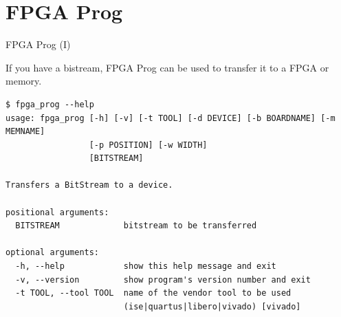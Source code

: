 \documentclass{beamer}
\newcommand{\fpgasetup}      {\textit{fpga\_setup}}
\newcommand{\console}        {\textit{console}}
\newcommand{\makefile}       {\textit{Makefile}}
\begin{document}
%  
%  

%  



\section{FPGA Prog}

\begin{frame}[fragile]{FPGA Prog (I)}
  \begin{block}{}
    If you have a bistream, FPGA Prog can be used to transfer it to a FPGA or memory.
  \end{block}{}
  \scriptsize
  \begin{verbatim}
$ fpga_prog --help
usage: fpga_prog [-h] [-v] [-t TOOL] [-d DEVICE] [-b BOARDNAME] [-m MEMNAME]
                 [-p POSITION] [-w WIDTH]
                 [BITSTREAM]

Transfers a BitStream to a device.

positional arguments:
  BITSTREAM             bitstream to be transferred

optional arguments:
  -h, --help            show this help message and exit
  -v, --version         show program's version number and exit
  -t TOOL, --tool TOOL  name of the vendor tool to be used
                        (ise|quartus|libero|vivado) [vivado]
  \end{verbatim}
\end{frame}
\end{document}
